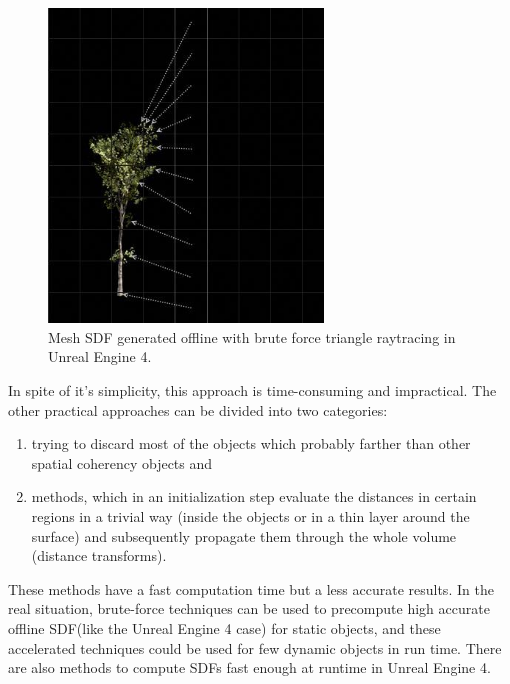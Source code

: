 \begin{figure}
\sidecaption
	\includegraphics[width=0.65\textwidth]{graphics/df/brute-force-method}
	\caption{Mesh SDF generated offline with brute force triangle raytracing in Unreal Engine 4.}
\end{figure}

In spite of it's simplicity, this approach is time-consuming and impractical. The other practical approaches can be divided into two categories:

\begin{enumerate}
	\item trying to discard most of the objects which probably farther than other spatial coherency objects and 
	\item methods, which in an initialization step evaluate the distances in certain regions in a trivial way (inside the objects or in a thin layer around the surface) and subsequently propagate them through the whole volume (distance transforms).
\end{enumerate}

These methods have a fast computation time but a less accurate results. In the real situation, brute-force techniques can be used to precompute high accurate offline SDF(like the Unreal Engine 4 case) for static objects, and these accelerated techniques could be used for few dynamic objects in run time. There are also methods to compute SDFs fast enough at runtime in Unreal Engine 4.





